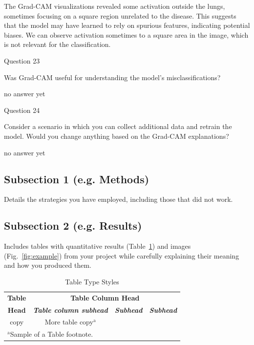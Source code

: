 \documentclass[conference]{IEEEtran}
\begin{document}
The Grad-CAM visualizations revealed some activation outside the lungs, sometimes focusing on a square region unrelated to the disease. This suggests that the model may have learned to rely on spurious features, indicating potential biases.
We can observe activation sometimes to a square area in the image, which is not relevant for the classification.

Question 23

Was Grad-CAM useful for understanding the model’s misclassifications?

no answer yet

Question 24

Consider a scenario in which you can collect additional data and retrain the model. Would you change anything based on the Grad-CAM explanations?

no answer yet

\subsection{Subsection 1 (e.g. Methods)}
 Details the strategies you have employed, including those that did not work.

\subsection{Subsection 2 (e.g. Results)}
Includes tables with quantitative results (Table~\ref{table:example}) and images (Fig.~\ref{fig:example}) from your project while carefully explaining their meaning and how you produced them.
\begin{table}[htbp]
\caption{Table Type Styles}
\begin{center}
\begin{tabular}{|c|c|c|c|}
\hline
\textbf{Table}&\multicolumn{3}{|c|}{\textbf{Table Column Head}} \\
\cline{2-4} 
\textbf{Head} & \textbf{\textit{Table column subhead}}& \textbf{\textit{Subhead}}& \textbf{\textit{Subhead}} \\
\hline
copy& More table copy$^{\mathrm{a}}$& &  \\
\hline
\multicolumn{4}{l}{$^{\mathrm{a}}$Sample of a Table footnote.}
\end{tabular}
\label{table:example}
\end{center}
\end{table}
\end{document}
